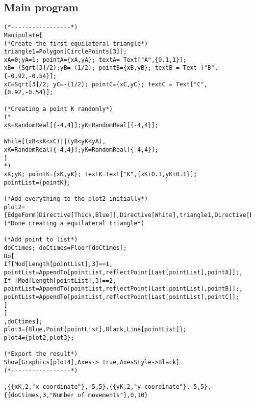 \documentclass[11pt, a4paper]{article}
\begin{document}
\subsection{Main program}
\begin{lstlisting}
(*-----------------*)
Manipulate[
(*Create the first equilateral triangle*)
triangle1=Polygon[CirclePoints[3]];
xA=0;yA=1; pointA={xA,yA}; textA= Text["A",{0.1,1}];
xB=-(Sqrt[3]/2);yB=-(1/2); pointB={xB,yB}; textB = Text ["B",{-0.92,-0.54}];
xC=Sqrt[3]/2; yC=-(1/2); pointC={xC,yC}; textC = Text["C",{0.92,-0.54}];

(*Creating a point K randomly*)
(*
xK=RandomReal[{-4,4}];yK=RandomReal[{-4,4}];

While[(xB<xK<xC)||(yB<yK<yA),
xK=RandomReal[{-4,4}];yK=RandomReal[{-4,4}];
]
*)
xK;yK; pointK={xK,yK}; textK=Text["K",{xK+0.1,yK+0.1}];
pointList={pointK};

(*Add everything to the plot2 initially*)
plot2={EdgeForm[Directive[Thick,Blue]],Directive[White],triangle1,Directive[Black],Point[pointA],Point[pointB],Point[pointC],textA,textB,textC,PointSize[0.02],Point[pointK],textK};
(*Done creating a equilateral triangle*)

(*Add point to list*)
doCtimes; doCtimes=Floor[doCtimes];
Do[
If[Mod[Length[pointList],3]==1,
pointList=AppendTo[pointList,reflectPoint[Last[pointList],pointA]];,
If [Mod[Length[pointList],3]==2,
pointList=AppendTo[pointList,reflectPoint[Last[pointList],pointB]];,
pointList=AppendTo[pointList,reflectPoint[Last[pointList],pointC]];
]
]
,doCtimes];
plot3={Blue,Point[pointList],Black,Line[pointList]};
plot4={plot2,plot3};

(*Export the result*)
Show[Graphics[plot4],Axes-> True,AxesStyle->Black]
(*-----------------*)

,{{xK,2,"x-coordinate"},-5,5},{{yK,2,"y-coordinate"},-5,5},{{doCtimes,3,"Number of movements"},0,10}
\end{lstlisting}
\end{document}
